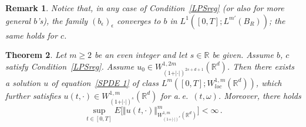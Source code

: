 \documentclass[a4paper,10pt]{article}
\newtheorem{theorem}{Theorem}
\newtheorem{remark}[theorem]{Remark}
\newcommand{\eps}{\epsilon}
\begin{document}
\begin{remark}
\label{b_eps-m-prime-convergence}
Notice that, in any case of Condition~\ref{LPSreg} (or also for more general $b$'s), the family $(b_\eps)_\eps$ converges to $b$ in $L^1([0,T];L^{m'}(B_R))$; the same holds for $c$.
\end{remark}

\begin{theorem}
\label{Theo existence regular sol}Let $m\geq2$ be an even
integer and let $s\in\mathbb{R}$ be given. Assume $b$, $c$ satisfy Condition~\ref{LPSreg}. Assume
$u_{0}\in W_{(1+ \vert \cdot \vert)^{2s+d+1}}^{1,2m}(\mathbb{R}^{d})$. Then there exists a solution $u$ of equation~\eqref{SPDE 1} of class $L^{m}([0,T];W_{loc}^{1,m}(\mathbb{R}^{d}))$, which further satisfies $u(t,\cdot)\in W_{( 1+ \vert \cdot \vert)^{s}}^{1,m}(\mathbb{R}^{d})$ for a.\,e.\ $(t,\omega)$. Moreover, there holds
\begin{equation}
\sup_{t\in[0,T]}E\Big[  \Vert u(t,\cdot) \Vert_{W_{(1+ \vert \cdot \vert)^{s}}^{1,m}(\mathbb{R}^{d})}^{m}\Big]  <\infty \,. 
\label{regularity of solution}
\end{equation}
\end{theorem}
\end{document}
